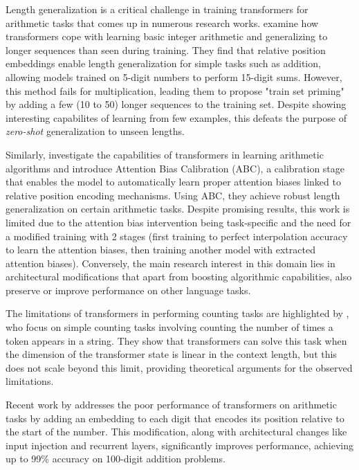 Length generalization is a critical challenge in training transformers for arithmetic tasks that comes up in numerous research works. \cite{jelassi_length_2023} examine how transformers cope with learning basic integer arithmetic and generalizing to longer sequences than seen during training. They find that relative position embeddings enable length generalization for simple tasks such as addition, allowing models trained on 5-digit numbers to perform 15-digit sums. However, this method fails for multiplication, leading them to propose "train set priming" by adding a few (10 to 50) longer sequences to the training set. Despite showing interesting capabilites of learning from few examples, this defeats the purpose of \emph{zero-shot} generalization to unseen lengths.

Similarly, \cite{duan_interpolation_2023} investigate the capabilities of transformers in learning arithmetic algorithms and introduce Attention Bias Calibration (ABC), a calibration stage that enables the model to automatically learn proper attention biases linked to relative position encoding mechanisms. Using ABC, they achieve robust length generalization on certain arithmetic tasks. Despite promising results, this work is limited due to the attention bias intervention being task-specific and the need for a modified training with 2 stages (first training to perfect interpolation accuracy to learn the attention biases, then training another model with extracted attention biases). Conversely, the main research interest  in this domain lies in architectural modifications that apart from boosting algorithmic capabilities, also preserve or improve performance on other language tasks.

The limitations of transformers in performing counting tasks are highlighted by \cite{yehudai_when_2024}, who focus on simple counting tasks involving counting the number of times a token appears in a string. They show that transformers can solve this task when the dimension of the transformer state is linear in the context length, but this does not scale beyond this limit, providing theoretical arguments for the observed limitations.

Recent work by \cite{mcleish_transformers_2024} addresses the poor performance of transformers on arithmetic tasks by adding an embedding to each digit that encodes its position relative to the start of the number. This modification, along with architectural changes like input injection and recurrent layers, significantly improves performance, achieving up to 99\% accuracy on 100-digit addition problems.

